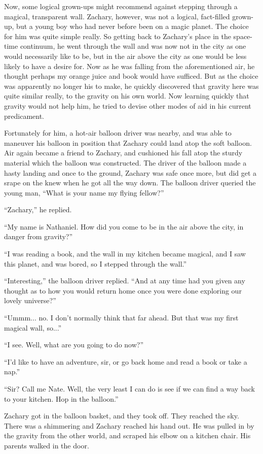 Now, some logical grown-ups might recommend against stepping through a magical, transparent wall. Zachary, however, was not a logical, fact-filled grown-up, but a young boy who had never before been on a magic planet. The choice for him was quite simple really. So getting back to Zachary's place in the space-time continuum, he went through the wall and was now not in the city as one would necessarily like to be, but in the air above the city as one would be less likely to have a desire for. Now as he was falling from the aforementioned air, he thought perhaps my orange juice and book would have sufficed. But as the choice was apparently no longer his to make, he quickly discovered that gravity here was quite similar really, to the gravity on his own world. Now learning quickly that gravity would not help him, he tried to devise other modes of aid in his current predicament.

Fortunately for him, a hot-air balloon driver was nearby, and was able to maneuver his balloon in position that Zachary could land atop the soft balloon. Air again became a friend to Zachary, and cushioned his fall atop the sturdy material which the balloon was constructed. The driver of the balloon made a hasty landing and once to the ground, Zachary was safe once more, but did get a srape on the knew when he got all the way down. The  balloon driver queried the young man, “What is your name my flying fellow?”

“Zachary,” he replied.

“My name is Nathaniel. How did you come to be in the air above the city, in danger from gravity?”

“I was reading a book, and the wall in my kitchen became magical, and I saw this planet, and was bored, so I stepped through the wall.”

“Interesting,” the balloon driver replied. “And at any time had you given any thought as to how you would return home once you were done exploring our lovely universe?”

“Ummm... no. I don't normally think that far ahead. But that was my first magical wall, so...”

“I see. Well, what are you going to do now?”

“I'd like to have an adventure, sir, or go back home and read a book or take a nap.”

“Sir? Call me Nate. Well, the very least I can do is see if we can find a way back to your kitchen. Hop in the balloon.”

Zachary got in the balloon basket, and they took off. They reached the sky. There was a shimmering and Zachary reached his hand out. He was pulled in by the gravity from the other world, and scraped his elbow on a kitchen chair. His parents walked in the door.